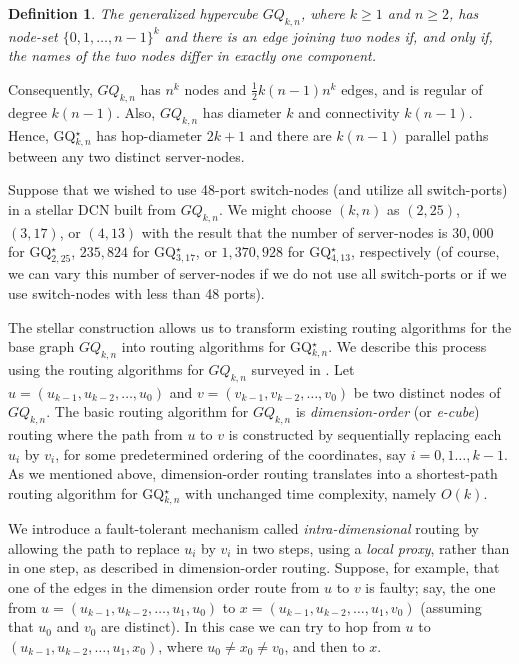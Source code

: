 \documentclass[]{amsart}
\newtheorem{definition}[theorem]{Definition}
\renewcommand\ast{\star}
\begin{document}
\begin{definition}
  \label{def:GQ}
  The \emph{generalized hypercube\/} $GQ_{k,n}$, where $k\geq 1$ and $n\geq 2$, has node-set $\{0,1,\ldots,n-1\}^k$ and there is an edge joining two nodes if, and only if, the names of the two nodes differ in exactly one component.
\end{definition}

Consequently, $GQ_{k,n}$ has $n^k$ nodes and $\frac{1}{2}k(n-1)n^k$ edges, and is regular of degree $k(n-1)$. Also, $GQ_{k,n}$ has diameter $k$ and connectivity $k(n-1)$. Hence, GQ$_{k,n}^\star$ has hop-diameter $2k+1$ and there are $k(n-1)$ parallel paths between any two distinct server-nodes. 

Suppose that we wished to use 48-port switch-nodes (and utilize all switch-ports) in a stellar DCN built from $GQ_{k,n}$. We might choose $(k,n)$ as $(2,25)$, $(3,17)$, or $(4,13)$ with the result that the number of server-nodes is $30,000$ for GQ$^\ast_{2,25}$, $235,824$ for GQ$^\ast_{3,17}$, or $1,370,928$ for GQ$^\ast_{4,13}$, respectively (of course, we can vary this number of server-nodes if we do not use all switch-ports or if we use switch-nodes with less than 48 ports). 

The stellar construction allows us to transform existing routing
algorithms for the base graph $GQ_{k,n}$ into routing algorithms for GQ$^\star_{k,n}$.  We describe this process using the routing algorithms for $GQ_{k,n}$ surveyed in
\cite{YoungYalamanchili1991}. Let $u = (u_{k-1}, u_{k-2}, \ldots , u_0)$ and $v = (v_{k-1}, v_{k-2},
\ldots, v_0)$ be two distinct nodes of $GQ_{k,n}$. The basic
routing algorithm for $GQ_{k,n}$ is \emph{dimension-order\/} (or
\emph{e-cube\/}) routing where the path from $u$ to $v$ is
constructed by sequentially replacing each $u_i$ by $v_i$, for some
predetermined ordering of the coordinates, say $i=0,1\ldots, k-1$.  As we mentioned above, 
dimension-order routing translates into a shortest-path routing
algorithm for GQ$^\star_{k,n}$ with unchanged time complexity, namely $O(k)$.

We introduce a fault-tolerant mechanism called
\emph{intra-dimensional\/} routing by allowing the path to replace $u_i$ by $v_i$ in two steps, using a \emph{local proxy\/}, rather than in one
step, as described in dimension-order routing.  Suppose, for example,
that one of the edges in the dimension order route from $u$
to $v$ is faulty; say, the one from $u=(u_{k-1},u_{k-2},\ldots, u_1,u_0)$ to $x=(u_{k-1},u_{k-2},\ldots, u_1,v_0)$ (assuming that $u_0$ and $v_0$ are distinct).  In this case we can
try to hop from $u$ to $(u_{k-1},u_{k-2},\ldots,u_1,x_0)$, where
$u_0\neq x_0\neq v_0$, and then to $x$.
\end{document}
